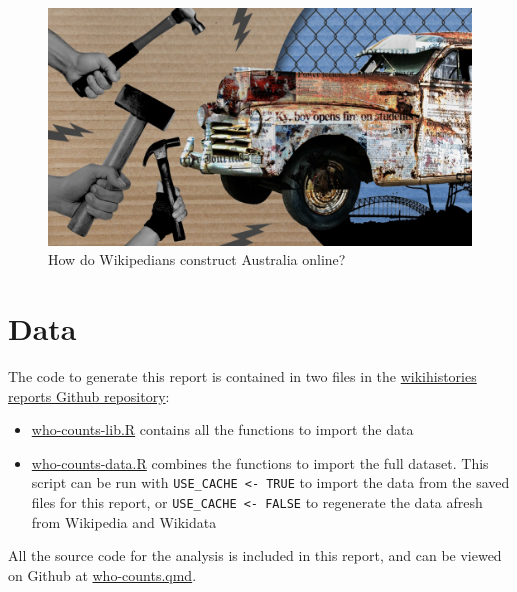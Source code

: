 \documentclass[
  a4paper,
  DIV=11,
  numbers=noendperiod]{scrreprt}
\providecommand{\tightlist}{%
  \setlength{\itemsep}{0pt}\setlength{\parskip}{0pt}}\usepackage{longtable,booktabs,array}
\begin{document}
\begin{figure}

{\centering \includegraphics{assets/objective-2.jpg}

}

\caption{How do Wikipedians construct Australia online?}

\end{figure}

\hypertarget{data}{%
\chapter{Data}\label{data}}

The code to generate this report is contained in two files in the
\href{https://github.com/wikihistories/reports}{wikihistories reports
Github repository}:

\begin{itemize}
\tightlist
\item
  \href{https://github.com/wikihistories/reports/tree/main/scripts/who-counts-lib.R}{who-counts-lib.R}
  contains all the functions to import the data
\item
  \href{https://github.com/wikihistories/reports/tree/main/scripts/who-counts-data.R}{who-counts-data.R}
  combines the functions to import the full dataset. This script can be
  run with \texttt{USE\_CACHE\ \textless{}-\ TRUE} to import the data
  from the saved files for this report, or
  \texttt{USE\_CACHE\ \textless{}-\ FALSE} to regenerate the data afresh
  from Wikipedia and Wikidata
\end{itemize}

All the source code for the analysis is included in this report, and can
be viewed on Github at
\href{https://github.com/wikihistories/reports/tree/main/who-counts.qmd}{who-counts.qmd}.
\end{document}

